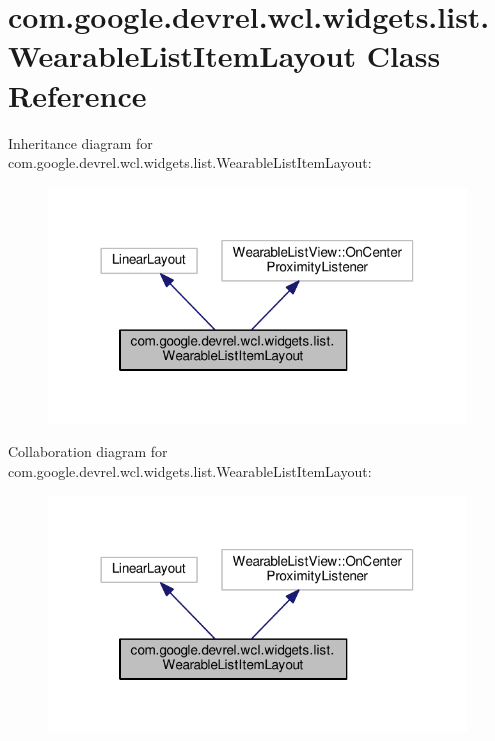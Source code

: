 \hypertarget{classcom_1_1google_1_1devrel_1_1wcl_1_1widgets_1_1list_1_1WearableListItemLayout}{}\section{com.\+google.\+devrel.\+wcl.\+widgets.\+list.\+Wearable\+List\+Item\+Layout Class Reference}
\label{classcom_1_1google_1_1devrel_1_1wcl_1_1widgets_1_1list_1_1WearableListItemLayout}


Inheritance diagram for com.\+google.\+devrel.\+wcl.\+widgets.\+list.\+Wearable\+List\+Item\+Layout\+:\nopagebreak
\begin{figure}[H]
\begin{center}
\leavevmode
\includegraphics[width=314pt]{d3/de8/classcom_1_1google_1_1devrel_1_1wcl_1_1widgets_1_1list_1_1WearableListItemLayout__inherit__graph}
\end{center}
\end{figure}


Collaboration diagram for com.\+google.\+devrel.\+wcl.\+widgets.\+list.\+Wearable\+List\+Item\+Layout\+:\nopagebreak
\begin{figure}[H]
\begin{center}
\leavevmode
\includegraphics[width=314pt]{d8/dfc/classcom_1_1google_1_1devrel_1_1wcl_1_1widgets_1_1list_1_1WearableListItemLayout__coll__graph}
\end{center}
\end{figure}

